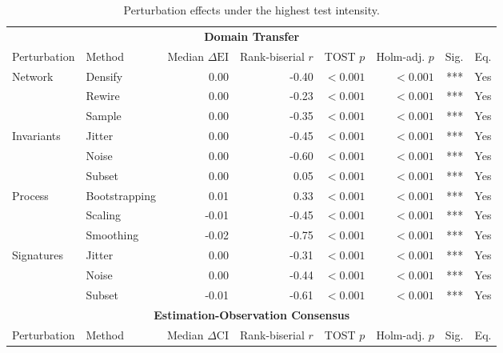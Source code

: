 \documentclass{article}
\begin{document}
\clearpage
\begin{table}[H]
\centering
\footnotesize
\captionsetup{position=top,skip=12pt}
\caption{Perturbation effects under the highest test intensity.}
\label{tab:si-perturb}
\setlength{\tabcolsep}{2pt}
\begin{tabularx}{\linewidth}{@{}l>{\raggedright\arraybackslash}Xrrrrrr@{}}
\toprule
\multicolumn{8}{c}{\textbf{Domain Transfer}} \\
\cmidrule(lr){1-8}
Perturbation & Method & \shortstack{Median\\$\Delta\mathrm{EI}$} & \shortstack{Rank-biserial\\$r$} & \shortstack{TOST\\$p$} & \shortstack{Holm-adj.\\$p$} & Sig. & Eq. \\
\midrule
Network & Densify & 0.00 & -0.40 & $<0.001$ & $<0.001$ & *** & Yes \\
 & Rewire & 0.00 & -0.23 & $<0.001$ & $<0.001$ & *** & Yes \\
 & Sample & 0.00 & -0.35 & $<0.001$ & $<0.001$ & *** & Yes \\
\addlinespace
Invariants & Jitter & 0.00 & -0.45 & $<0.001$ & $<0.001$ & *** & Yes \\
 & Noise & 0.00 & -0.60 & $<0.001$ & $<0.001$ & *** & Yes \\
 & Subset & 0.00 & 0.05 & $<0.001$ & $<0.001$ & *** & Yes \\
\addlinespace
Process & Bootstrapping & 0.01 & 0.33 & $<0.001$ & $<0.001$ & *** & Yes \\
 & Scaling & -0.01 & -0.45 & $<0.001$ & $<0.001$ & *** & Yes \\
 & Smoothing & -0.02 & -0.75 & $<0.001$ & $<0.001$ & *** & Yes \\
\addlinespace
Signatures & Jitter & 0.00 & -0.31 & $<0.001$ & $<0.001$ & *** & Yes \\
 & Noise & 0.00 & -0.44 & $<0.001$ & $<0.001$ & *** & Yes \\
 & Subset & -0.01 & -0.61 & $<0.001$ & $<0.001$ & *** & Yes \\
\midrule
\multicolumn{8}{c}{\textbf{Estimation-Observation Consensus}} \\
\cmidrule(lr){1-8}
Perturbation & Method & \shortstack{Median\\$\Delta\mathrm{CI}$} & \shortstack{Rank-biserial\\$r$} & \shortstack{TOST\\$p$} & \shortstack{Holm-adj.\\$p$} & Sig. & Eq. \\

\end{tabularx}
\end{table}
\end{document}
